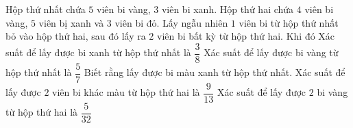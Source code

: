 \begin{ex}%
	Hộp thứ nhất chứa $5$ viên bi vàng, $3$ viên bi xanh. Hộp thứ hai chứa $4$ viên bi vàng, $5$ viên bị xanh và $3$ viên bi đỏ. Lấy ngẫu nhiên $1$ viên bi từ hộp thứ nhất  bỏ vào hộp thứ hai, sau đó lấy ra $2$ viên bi bất kỳ từ hộp thứ hai. Khi đó
	 \choiceTF
		{\True Xác suất để lấy được bi xanh từ hộp thứ nhất là  $\dfrac{3}{8} $}
		 {Xác suất để lấy được bi vàng từ hộp thứ nhất là $\dfrac{5}{7} $}
		{\True Biết rằng lấy được bi màu xanh từ hộp thứ nhất. Xác  suất để lấy được $2$ viên bi khác màu từ hộp thứ hai là $\dfrac{9}{13} $}
		{Xác suất để lấy  được $2$ bi vàng từ hộp thứ hai là $\dfrac{5}{32} $}
\end{ex}

